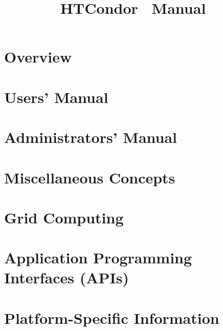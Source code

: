 \documentclass[titlepage,oneside,latex2html,ps2pdf,bookmarks,bookmarksnumbered,plainpages=false,pdfpagelabels]{book}
\begin{document}
\title{HTCondor\textsuperscript{\small{\texttrademark}} \VersionNotice\ Manual}
\author{\AuthorNotice}
\maketitle


\tableofcontents

\sloppy

\begin{small}

\end{small}

\newpage
{}

\chapter{Overview}
\label{overview}


\chapter{Users' Manual}
\label{user-manual}


\chapter{Administrators' Manual}
\label{admin-manual}


\chapter{Miscellaneous Concepts}
\label{misc-concepts}


\chapter{Grid Computing}
\label{grid-computing}


\chapter{Application Programming Interfaces (APIs)}
\label{APIs}


\chapter{Platform-Specific Information}
\label{platforms}

\end{document}
